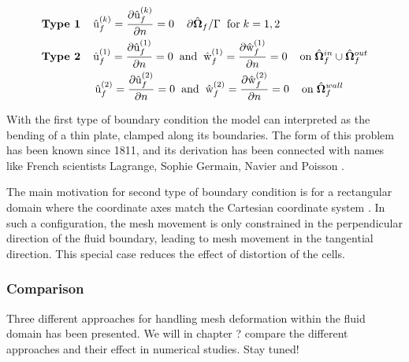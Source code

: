 \begin{align*}
&\textbf{Type 1} \hspace{4mm} \ha{u}_f^{(k)} = \pder{\ha{u}_f^{(k)}}{n} = 0 \hspace{4mm} \partial \hat{\Omega}_f / \Gamma \hspace{2mm} \text{for} \hspace{1mm} k = 1, 2 \\
&\textbf{Type 2} \hspace{4mm} \ha{u}_f^{(1)} = \pder{\ha{u}_f^{(1)}}{n} = 0 
\hspace{2mm} \text{and} \hspace{2mm} \ha{w}_f^{(1)} = \pder{\ha{w}_f^{(1)}}{n} = 0 \hspace{4mm} \text{on} \hspace{1mm} \hat{\Omega}_f^{in} \cup \hat{\Omega}_f^{out} \\ 
&\hspace{17mm}  \ha{u}_f^{(2)} = \pder{\ha{u}_f^{(2)}}{n} = 0 
\hspace{2mm} \text{and} \hspace{2mm} \ha{w}_f^{(2)} = \pder{\ha{w}_f^{(2)}}{n} = 0 \hspace{4mm} \text{on} \hspace{1mm}  \hat{\Omega}_f^{wall}
\end{align*}

With the first type of boundary condition the model can interpreted as the bending of a thin plate, clamped along its boundaries. The form of this problem has been known since 1811, and its derivation has been connected with names like  French scientists Lagrange, Sophie Germain, Navier and Poisson \cite{Meleshko1997}.  

The main motivation for second type of boundary condition is for a rectangular domain where the coordinate axes match the Cartesian coordinate system \cite{Wicka}. In such a configuration, the mesh movement is only constrained in the perpendicular direction of the fluid boundary, leading to mesh movement in the tangential direction. This special case reduces the effect of distortion of the cells.  

\subsubsection*{Comparison}
Three different approaches for handling mesh deformation within the fluid domain has been presented. We will in chapter ? compare the different approaches and their effect in numerical studies. Stay tuned!




